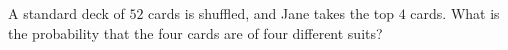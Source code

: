 A standard deck of $52$ cards is shuffled, and Jane takes the top $4$ cards. What is the probability that the four cards are of four different suits?
